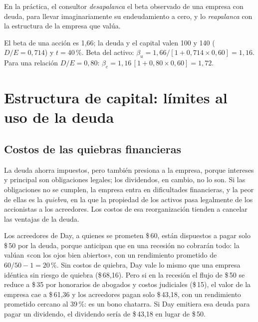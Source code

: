 En la práctica, el consultor \emph{desapalanca} el beta observado de una empresa con deuda, para llevar imaginariamente su endeudamiento a cero, y lo \emph{reapalanca} con la estructura de la empresa que valúa.

\begin{ejemplo}
El beta de una acción es 1,66; la deuda y el capital valen 100 y 140 ($D/E = 0{,}714$) y $t = 40\,\%$. Beta del activo: $\beta_u = 1{,}66/[1 + 0{,}714\times 0{,}60] = 1{,}16$. Para una relación $D/E = 0{,}80$: $\beta_e = 1{,}16\,[1 + 0{,}80\times 0{,}60] = 1{,}72$.
\end{ejemplo}

\section{Estructura de capital: límites al uso de la deuda}\label{sec:u3-limites}

\subsection{Costos de las quiebras financieras}

La deuda ahorra impuestos, pero también presiona a la empresa, porque intereses y principal son obligaciones legales; los dividendos, en cambio, no lo son. Si las obligaciones no se cumplen, la empresa entra en dificultades financieras, y la peor de ellas es la \emph{quiebra}, en la que la propiedad de los activos pasa legalmente de los accionistas a los acreedores. Los costos de esa reorganización tienden a cancelar las ventajas de la deuda.

\begin{ejemplo}
Los acreedores de Day, a quienes se prometen \$\,60, están dispuestos a pagar solo \$\,50 por la deuda, porque anticipan que en una recesión no cobrarán todo: la valúan «con los ojos bien abiertos», con un rendimiento prometido de $60/50 - 1 = 20\,\%$. Sin costos de quiebra, Day vale lo mismo que una empresa idéntica sin riesgo de quiebra (\$\,68,16). Pero si en la recesión el flujo de \$\,50 se reduce a \$\,35 por honorarios de abogados y costos judiciales (\$\,15), el valor de la empresa cae a \$\,61,36 y los acreedores pagan solo \$\,43,18, con un rendimiento prometido cercano al 39\,\%: es un bono chatarra. Si Day emitiera esa deuda para pagar un dividendo, el dividendo sería de \$\,43,18 en lugar de \$\,50.
\end{ejemplo}

